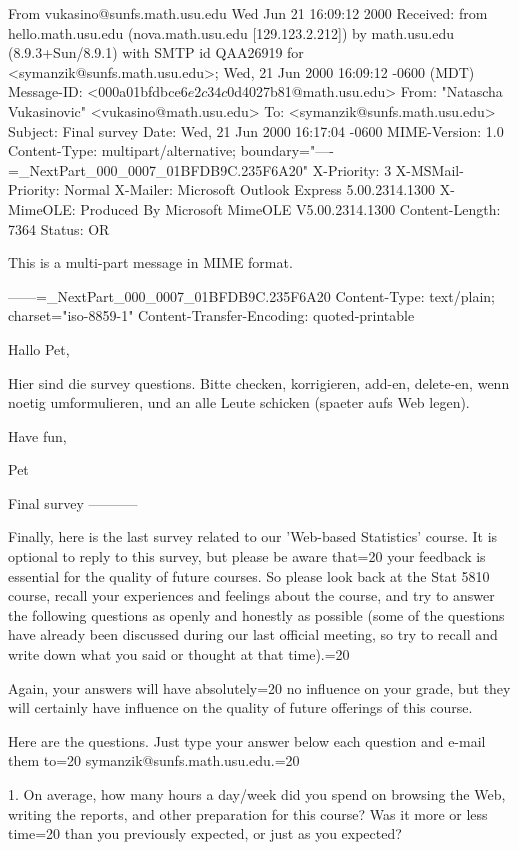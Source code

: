 From vukasino@sunfs.math.usu.edu Wed Jun 21 16:09:12 2000
Received: from hello.math.usu.edu (nova.math.usu.edu [129.123.2.212])
	by math.usu.edu (8.9.3+Sun/8.9.1) with SMTP id QAA26919
	for <symanzik@sunfs.math.usu.edu>; Wed, 21 Jun 2000 16:09:12 -0600 (MDT)
Message-ID: <000a01bfdbce$6e2c34c0$d4027b81@math.usu.edu>
From: "Natascha Vukasinovic" <vukasino@math.usu.edu>
To: <symanzik@sunfs.math.usu.edu>
Subject: Final survey
Date: Wed, 21 Jun 2000 16:17:04 -0600
MIME-Version: 1.0
Content-Type: multipart/alternative;
	boundary="----=_NextPart_000_0007_01BFDB9C.235F6A20"
X-Priority: 3
X-MSMail-Priority: Normal
X-Mailer: Microsoft Outlook Express 5.00.2314.1300
X-MimeOLE: Produced By Microsoft MimeOLE V5.00.2314.1300
Content-Length: 7364
Status: OR

This is a multi-part message in MIME format.

------=_NextPart_000_0007_01BFDB9C.235F6A20
Content-Type: text/plain;
	charset="iso-8859-1"
Content-Transfer-Encoding: quoted-printable

Hallo Pet,

Hier sind die survey questions. Bitte checken, korrigieren,
add-en, delete-en, wenn noetig umformulieren, und
an alle Leute schicken (spaeter aufs Web legen).

Have fun,

Pet


Final survey
-----------

Finally, here is the last survey related to our
'Web-based Statistics' course. It is optional to
reply to this survey, but please be aware that=20
your feedback is essential for the quality of
future courses. So please look back at the
Stat 5810 course, recall your experiences and
feelings about the course, and try to answer
the following questions as openly and
honestly as possible (some of the questions
have already been discussed during our
last official meeting, so try to recall and
write down what you said or thought at that time).=20

Again, your answers will have absolutely=20
no influence on your grade,
but they will certainly have influence on the
quality of future offerings of this course.

Here are the questions. Just type your answer
below each question and e-mail them to=20
symanzik@sunfs.math.usu.edu.=20

1. On average, how many hours a day/week
did you spend on browsing the Web, writing
the reports, and other preparation for
this course? Was it more or less time=20
than you previously expected, or just
as you expected?


